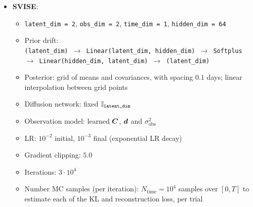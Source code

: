 \begin{itemize}
\begin{itemize}
        \item \texttt{latent\_dim = 2}, \texttt{obs\_dim = 2},  \texttt{time\_dim = 1}, \texttt{hidden\_dim = 64}
        \item 
        Prior drift:\\
        \texttt{(latent\_dim) $\to$ Linear(latent\_dim, hidden\_dim) $\to$ Softplus $\to$ Linear(hidden\_dim, latent\_dim) $\to$ (latent\_dim)}
         \item Posterior: grid of means and covariances, with spacing $0.1$ days; linear interpolation  between grid points
        \item Diffusion network:\\ 
        state-dependent, diagonal diffusion coefficient; the input to each diagonal entry is a single hidden dimension\\
        \texttt{latent\_dim $\times$ [(1) $\to$ Linear(1, hidden\_dim) $\to$ Softplus $\to$ Linear(hidden\_dim, 1) $\to$ Sigmoid $\to$ (1)]}
        \item Observation model: learned $\mbC$, $\mbd$ and $\sigma_{\mathrm{obs}}^2$
        \item LR: $10^{-2}$ initial, $10^{-3}$ final (exponential LR decay)
        \item Gradient clipping: $5.0$
        \item Iterations: $3 \cdot 10^4$
        \item Number MC samples (per iteration): $N_{\mathrm{time}} = 10^4$ samples over $[0, T]$ to estimate each of the KL and reconstruction loss, per trial
    \end{itemize}
    \item \textbf{SVISE}:
    \begin{itemize}
        \item \texttt{latent\_dim = 2}, \texttt{obs\_dim = 2},  \texttt{time\_dim = 1}, \texttt{hidden\_dim = 64}
        \item 
        Prior drift:\\
        \texttt{(latent\_dim) $\to$ Linear(latent\_dim, hidden\_dim) $\to$ Softplus $\to$ Linear(hidden\_dim, latent\_dim) $\to$ (latent\_dim)}
         \item Posterior: grid of means and covariances, with spacing $0.1$ days; linear interpolation  between grid points
        \item Diffusion network: fixed $\mathbb{I}_{\texttt{latent\_dim}}$
        \item Observation model: learned $\mbC$, $\mbd$ and $\sigma_{\mathrm{obs}}^2$
        \item LR: $10^{-2}$ initial, $10^{-3}$ final (exponential LR decay)
        \item Gradient clipping: $5.0$
        \item Iterations: $3 \cdot 10^4$
        \item Number MC samples (per iteration): $N_{\mathrm{time}} = 10^4$ samples over $[0, T]$ to estimate each of the KL and reconstruction loss, per trial
    \end{itemize}
\end{itemize}

